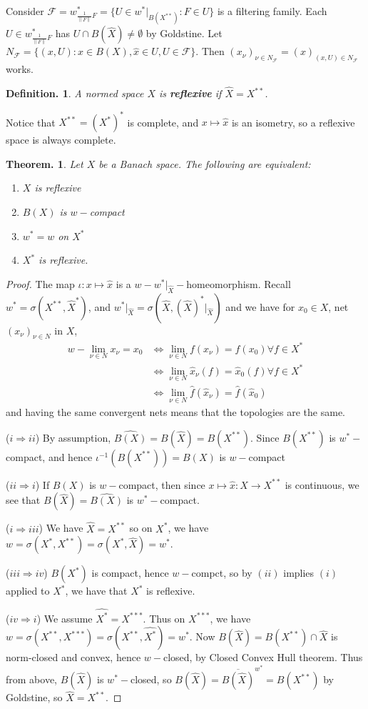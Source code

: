 \documentclass[11pt, a4paper]{memoir}
\newcommand{\imp}[2]{($#1\Rightarrow#2$)\hspace{0.2cm}}
\newcommand{\norm}[1]{\ensuremath{\left\lVert#1\right\rVert}}
\theoremstyle{change}
\newtheorem{theorem}{Theorem.}[section]
\theoremstyle{plain}
\theoremstyle{nonumberplain}
\newtheorem{definition}{Definition.}
\newtheorem{proof}{Proof}
\numberwithin{equation}{section}
\begin{document}
Consider $\mathcal{F}=w^*_{\frac{1}{\norm{F}}F}=\{U\in w^*|_{B(X^{**})}:F\in U\}$ is a filtering family.
Each $U\in w^*_{\frac{1}{\norm{F}}F}$ has $U\cap B(\hat X)\neq\emptyset$ by Goldstine.
Let $N_{\mathcal{F}}=\{(x,U):x\in B(X),\hat x\in U,U\in\mathcal{F}\}$.
Then $(x_\nu)_{\nu\in N_{\mathcal{F}}}=(x)_{(x,U)\in N_{\mathcal{F}}}$ works.
\begin{definition}
    A normed space $X$ is \textbf{reflexive} if $\hat X=X^{**}$.
\end{definition}
Notice that $X^{**}=(X^*)^*$ is complete, and $x\mapsto\hat x$ is an isometry, so a reflexive space is always complete.
\begin{theorem}
    Let $X$ be a Banach space.
    The following are equivalent:
    \begin{enumerate}[nl,r]
        \item $X$ is reflexive
        \item $B(X)$ is $w-$compact
        \item $w^*=w$ on $X^*$
        \item $X^*$ is reflexive.
    \end{enumerate}
\end{theorem}
\begin{proof}
    The map $\iota:x\mapsto\hat x$ is a $w-w^*|_{\hat X}-$homeomorphism.
    Recall $w^*=\sigma(X^{**},\hat X^*)$, and $w^*|_{\hat X}=\sigma(\hat X,(\hat X)^*|_{\hat X})$ and we have for $x_0\in X$, net $(x_\nu)_{\nu\in N}$ in $X$,
    \begin{align*}
        w-\lim_{\nu\in N}x_\nu = x_0 &\iff \lim_{\nu\in N}f(x_\nu)=f(x_0)\forall f\in X^*\\
                                     &\iff \lim_{\nu\in N}\hat x_\nu(f)=\hat x_0(f)\forall f\in X^*\\
                                     &\iff \lim_{\nu\in N}\hat f(\hat x_\nu)=\hat f(\hat x_0)
    \end{align*}
    and having the same convergent nets means that the topologies are the same.

    \imp{i}{ii}
    By assumption, $\widehat{B(X)}=B(\hat X)=B(X^{**})$.
    Since $B(X^{**})$ is $w^*-$compact, and hence $\iota^{-1}(B(X^{**}))=B(X)$ is $w-$compact

    \imp{ii}{i}
    If $B(X)$ is $w-$compact, then since $x\mapsto\hat x:X\to X^{**}$ is continuous, we see that $B(\hat X)=\widehat{B(X)}$ is $w^*-$compact.

    \imp{i}{iii}
    We have $\hat X=X^{**}$ so on $X^*$, we have $w=\sigma(X^*,X^{**})=\sigma(X^*,\hat X)=w^*$.

    \imp{iii}{iv}
    $B(X^*)$ is compact, hence $w-$compct, so by $(ii)$ implies $(i)$ applied to $X^*$, we have that $X^*$ is reflexive.

    \imp{iv}{i}
    We assume $\widehat{X^*}=X^{***}$.
    Thus on $X^{***}$, we have $w=\sigma(X^{**},X^{***})=\sigma(X^{**},\widehat{X^*})=w^*$.
    Now $B(\hat X)=B(X^{**})\cap\hat X$ is norm-closed and convex, hence $w-$closed, by Closed Convex Hull theorem.
    Thus from above, $B(\hat X)$ is $w^*-$closed, so $B(\hat X)=\overline{B(\hat X)}^{w^*}=B(X^{**})$ by Goldstine, so $\hat X=X^{**}$.
\end{proof}
\end{document}
